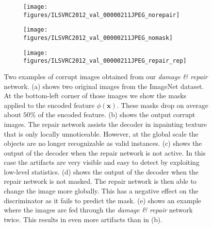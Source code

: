 \documentclass[10pt,twocolumn,letterpaper]{article}
\begin{document}
\begin{figure}[t]
\begin{center}
\begin{subfigure}[h]{0.195\linewidth}
	\texttt{[image: figures/ILSVRC2012\_val\_00000211JPEG\_norepair]}%
        \caption{}
\end{subfigure}\hspace{.4mm}%
\begin{subfigure}[h]{0.195\linewidth}
	\texttt{[image: figures/ILSVRC2012\_val\_00000211JPEG\_nomask]}%
        \caption{}
\end{subfigure}\hspace{.4mm}%
\begin{subfigure}[h]{0.195\linewidth}
	\texttt{[image: figures/ILSVRC2012\_val\_00000211JPEG\_repair\_rep]}%
        \caption{}
\end{subfigure}
\end{center}
   \caption{Two examples of corrupt images obtained from our \emph{damage \& repair} network. (a) shows two original images from the ImageNet dataset. At the bottom-left corner of those images we show the masks applied to the encoded feature $\phi(\mathbf{x})$. These masks drop on average about $50\%$ of the encoded feature. (b) shows the output corrupt images. The repair network assists the decoder in inpainting texture that is only locally unnoticeable. However, at the global scale the objects are no longer recognizable as valid instances. (c) shows the output of the decoder when the repair network is not active. In this case the artifacts are very visible and easy to detect by exploiting low-level statistics. (d) shows the output of the decoder when the repair network is not masked. The repair network is then able to change the image more globally. This has a negative effect on the discriminator as it fails to predict the mask. (e) shows an example where the images are fed through the \emph{damage \& repair} network twice. This results in even more artifacts than in (b).}
\label{fig:repair}
\end{figure}
\end{document}
